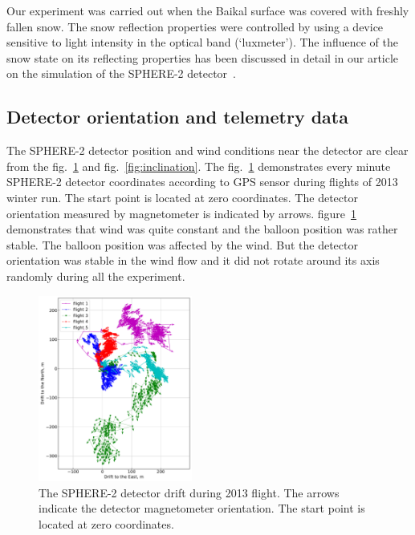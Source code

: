 \documentclass[final,5p,times,twocolumn]{elsarticle}
\begin{document}
Our experiment was carried out when the Baikal surface was covered with freshly fallen snow. The snow reflection properties were controlled by using a device sensitive to light intensity in the optical band (`luxmeter'). The influence of the snow state on its reflecting properties has been discussed in detail in our article on the simulation of the SPHERE-2 detector~\cite{Ant19}. 


\subsection{Detector orientation and telemetry data\label{sect:telemetrydata}}

The \mbox{SPHERE-2} detector position and wind conditions near the detector are clear from the fig.~\ref{fig:gps_compass} and fig.~\ref{fig:inclination}. The fig.~\ref{fig:gps_compass} demonstrates every minute \mbox{SPHERE-2} detector coordinates according to GPS sensor during flights of 2013 winter run. The start point is located at zero coordinates. The detector orientation measured by magnetometer is indicated by arrows. figure~\ref{fig:gps_compass} demonstrates that wind was quite constant and the balloon position was rather stable. The balloon position was affected by the wind. But the detector orientation was stable in the wind flow and it did not rotate around its axis randomly during all the experiment.  

\begin{figure}[tb]
\includegraphics[width=0.45\textwidth]{figs/GPS+quiver.pdf}\hspace{2pc}%
\caption{The SPHERE-2 detector drift during 2013 flight. The arrows indicate the detector magnetometer orientation. The start point is located at zero coordinates.}
\label{fig:gps_compass}
\end{figure}
\end{document}
